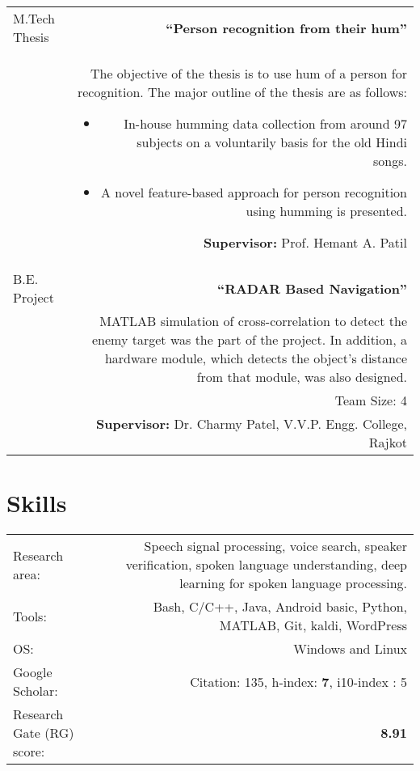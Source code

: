 \documentclass[10pt]{article}
\begin{document}
\begin{tabular}{L!{\VRule}R}
M.Tech Thesis&\textbf{``Person recognition from their hum''}\\&The objective of the thesis is to use hum of a person for recognition. The major outline of the thesis are as follows: 
\vspace{-0.3cm}
\begin{itemize}
	\setlength\itemsep{0em}
	\item In-house humming data collection from around 97 subjects on a voluntarily basis for the old Hindi songs. 
	\item A novel feature-based approach for person recognition using humming is presented.
\end{itemize} 
\textbf{Supervisor:} Prof. Hemant A. Patil\vspace{0.5cm}\\
B.E. Project&\textbf{``RADAR Based Navigation''}\\&MATLAB simulation of cross-correlation to detect the enemy target was the part of the project. In addition, a hardware module, which detects the object's  distance from that module, was also designed.\\& Team Size: 4\\&\vspace{0.01cm} \textbf{Supervisor:} Dr. Charmy Patel, V.V.P. Engg. College, Rajkot
\end{tabular}
\vspace*{0.5cm}
\section*{Skills}
\begin{tabular}{L!{\VRule}R}
Research area: &Speech signal processing, voice search, speaker verification, spoken language understanding, deep learning for spoken language processing.\vspace{0.2cm}\\
Tools:& Bash, C/C++, Java, Android basic, Python, MATLAB,  Git, kaldi, WordPress \vspace{0.2cm}\\
OS: & Windows and Linux \vspace{0.2cm}\\
Google Scholar: & {Citation}: 135, {h-index}: \textbf{7}, {i10-index} : 5 \vspace{0.2cm}\\
Research Gate (RG) score: & \textbf{8.91}
\end{tabular}
\end{document}
